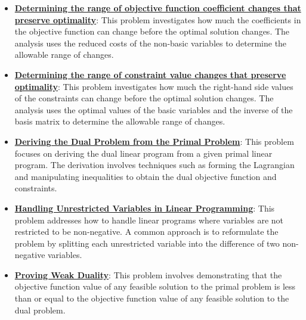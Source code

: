 \documentclass{article}%
\begin{document}
\begin{itemize}[leftmargin=*]%
\item \href{https://www.math.purdue.edu/~yipn/421/2024-09-26-Sensitivity.pdf#page=4}{\textbf{Determining the range of objective function coefficient changes that preserve optimality}}: This problem investigates how much the coefficients in the objective function can change before the optimal solution changes. The analysis uses the reduced costs of the non-basic variables to determine the allowable range of changes.%
\item \href{https://www.math.purdue.edu/~yipn/421/2024-09-26-Sensitivity.pdf#page=8}{\textbf{Determining the range of constraint value changes that preserve optimality}}: This problem investigates how much the right-hand side values of the constraints can change before the optimal solution changes. The analysis uses the optimal values of the basic variables and the inverse of the basis matrix to determine the allowable range of changes.%
\end{itemize}%
\begin{itemize}[leftmargin=*]%
\item \href{https://www.math.purdue.edu/~yipn/421/2024-10-01-DualGeneralLP.pdf#page=1}{\textbf{Deriving the Dual Problem from the Primal Problem}}: This problem focuses on deriving the dual linear program from a given primal linear program. The derivation involves techniques such as forming the Lagrangian and manipulating inequalities to obtain the dual objective function and constraints.%
\item \href{https://www.math.purdue.edu/~yipn/421/2024-10-01-DualGeneralLP.pdf#page=2}{\textbf{Handling Unrestricted Variables in Linear Programming}}: This problem addresses how to handle linear programs where variables are not restricted to be non-negative. A common approach is to reformulate the problem by splitting each unrestricted variable into the difference of two non-negative variables.%
\item \href{https://www.math.purdue.edu/~yipn/421/2024-10-01-DualGeneralLP.pdf#page=5}{\textbf{Proving Weak Duality}}: This problem involves demonstrating that the objective function value of any feasible solution to the primal problem is less than or equal to the objective function value of any feasible solution to the dual problem.%
\end{itemize}%
\end{document}
